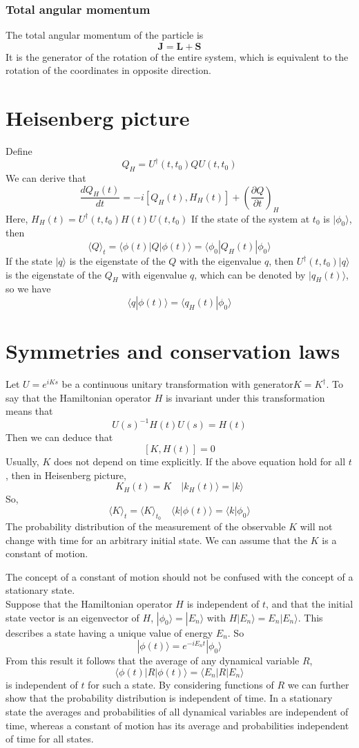 \documentclass[cyan]{elegantnote}
\begin{document}
\subsubsection{Total angular momentum}
\noindent
The total angular momentum of the particle is 
\[\bm{J} = \bm{L} + \bm{S}\]
It is the generator of the rotation of the entire system, which is equivalent to the rotation of the coordinates in opposite direction.

\section{Heisenberg picture}
\noindent
Define
\[Q_H = U^{\dagger}(t,t_0)QU(t,t_0)\]
We can derive that
\[\frac{dQ_H(t)}{dt} = -i[Q_H(t),H_H(t)] + \left(\frac{\partial Q}{\partial t}\right)_H \]
Here, $H_H(t) = U^{\dagger}(t,t_0) H(t) U(t,t_0)$
If the state of the system at $t_0$ is $|\phi_0\rangle$, then
\[\langle Q \rangle_t = \langle \phi(t) | Q | \phi(t) \rangle = \langle \phi_0 | Q_H(t) | \phi_0 \rangle\]
If the state $|q\rangle$ is the eigenstate of the $Q$ with the eigenvalue $q$, then $U^{\dagger}(t,t_0)|q\rangle$ is the eigenstate of the $Q_H$ with eigenvalue $q$, which can be denoted by $|q_H(t)\rangle$, so we have
\[\langle q | \phi(t) \rangle = \langle q_H(t) | \phi_0 \rangle\]

\section{Symmetries and conservation laws}
\noindent
Let $U = e^{iKs}$ be a continuous unitary transformation with generator$K=K^{\dagger}$. To say that the Hamiltonian
operator $H$ is invariant under this transformation means that
\[U(s)^{-1} H(t) U(s) = H(t)\]
Then we can deduce that
\[[K,H(t)] = 0\]
Usually, $K$ does not depend on time explicitly. If the above equation hold for all $t$, then in Heisenberg picture, 
\[K_H(t) = K \quad |k_H(t) \rangle = | k \rangle\]
So, 
\[\langle K \rangle_t = \langle K \rangle_{t_0} \quad \langle k | \phi(t) \rangle = \langle k | \phi_0 \rangle\]
The probability distribution of the measurement of the observable $K$ will not change with time for an arbitrary initial state. We can assume that the $K$ is a constant of motion.

\begin{note}
The concept of a constant of motion should not be confused with the
concept of a stationary state. \\
Suppose that the Hamiltonian operator $H$ is independent of $t$, and that the initial state vector is an eigenvector of $H$, $|\phi_0\rangle = | E_n \rangle$ with $H |E_n\rangle = E_n | E_n \rangle$. This describes a state having a unique value of energy $E_n$. So
\[|\phi(t)\rangle = e^{-iE_nt} |\phi_0\rangle\]
From this result it follows that the average of any dynamical variable $R$,
\[\langle \phi(t) | R | \phi(t) \rangle = \langle E_n | R | E_n \rangle\]
is independent of $t$ for such a state. By considering functions of $R$ we can further show that the probability distribution is independent of time. In a stationary state the averages and probabilities of all dynamical variables are independent of time, whereas a constant of motion has its average and probabilities independent of time for all states.
\end{note}
\end{document}
